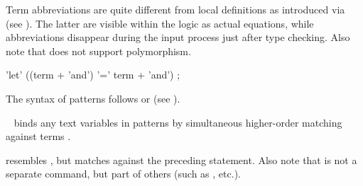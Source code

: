 \begin{isabellebody}
\begin{isamarkuptext}
  \medskip Term abbreviations are quite different from local
  definitions as introduced via \hyperlink{command.def}{\mbox{}} (see
  ).  The latter are visible within the
  logic as actual equations, while abbreviations disappear during the
  input process just after type checking.  Also note that \hyperlink{command.def}{\mbox{}} does not support polymorphism.

  \begin{rail}
    'let' ((term + 'and') '=' term + 'and')
    ;  
  \end{rail}

  The syntax of \hyperlink{keyword.is}{\mbox{}} patterns follows 
  or  (see ).

  \begin{description}

  \item \hyperlink{command.let}{\mbox{}}~ binds any
  text variables in patterns  by simultaneous
  higher-order matching against terms .

  \item {} resembles \hyperlink{command.let}{\mbox{}}, but
  matches  against the preceding statement.  Also
  note that \hyperlink{keyword.is}{\mbox{}} is not a separate command, but part of
  others (such as \hyperlink{command.assume}{\mbox{}}, \hyperlink{command.have}{\mbox{}} etc.).

  \end{description}


\end{isamarkuptext}
\end{isabellebody}
